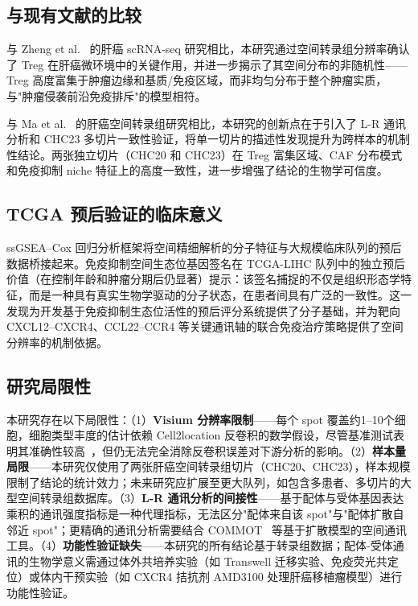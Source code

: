 \documentclass[12pt, a4paper]{ctexart}
\begin{document}
\subsection{与现有文献的比较}

与 Zheng et al.~\cite{zheng2017landscape} 的肝癌 scRNA-seq 研究相比，本研究通过空间转录组分辨率确认了 Treg 在肝癌微环境中的关键作用，并进一步揭示了其空间分布的非随机性——Treg 高度富集于肿瘤边缘和基质/免疫区域，而非均匀分布于整个肿瘤实质，与"肿瘤侵袭前沿免疫排斥"的模型相符。

与 Ma et al.~\cite{ma2019comprehensive} 的肝癌空间转录组研究相比，本研究的创新点在于引入了 L-R 通讯分析和 CHC23 多切片一致性验证，将单一切片的描述性发现提升为跨样本的机制性结论。两张独立切片（CHC20 和 CHC23）在 Treg 富集区域、CAF 分布模式和免疫抑制 niche 特征上的高度一致性，进一步增强了结论的生物学可信度。

\subsection{TCGA 预后验证的临床意义}

ssGSEA--Cox 回归分析框架将空间精细解析的分子特征与大规模临床队列的预后数据桥接起来。免疫抑制空间生态位基因签名在 TCGA-LIHC 队列中的独立预后价值（在控制年龄和肿瘤分期后仍显著）提示：该签名捕捉的不仅是组织形态学特征，而是一种具有真实生物学驱动的分子状态，在患者间具有广泛的一致性。这一发现为开发基于免疫抑制生态位活性的预后评分系统提供了分子基础，并为靶向 CXCL12--CXCR4、CCL22--CCR4 等关键通讯轴的联合免疫治疗策略提供了空间分辨率的机制依据。

\subsection{研究局限性}

本研究存在以下局限性：（1）\textbf{Visium 分辨率限制}——每个 spot 覆盖约1--10个细胞，细胞类型丰度的估计依赖 Cell2location 反卷积的数学假设，尽管基准测试表明其准确性较高~\cite{sang2023spotless}，但仍无法完全消除反卷积误差对下游分析的影响。（2）\textbf{样本量局限}——本研究仅使用了两张肝癌空间转录组切片（CHC20、CHC23），样本规模限制了结论的统计效力；未来研究应扩展至更大队列，如包含多患者、多切片的大型空间转录组数据库。（3）\textbf{L-R 通讯分析的间接性}——基于配体与受体基因表达乘积的通讯强度指标是一种代理指标，无法区分"配体来自该 spot"与"配体扩散自邻近 spot"；更精确的通讯分析需要结合 COMMOT~\cite{cang2023commot} 等基于扩散模型的空间通讯工具。（4）\textbf{功能性验证缺失}——本研究的所有结论基于转录组数据；配体-受体通讯的生物学意义需通过体外共培养实验（如 Transwell 迁移实验、免疫荧光共定位）或体内干预实验（如 CXCR4 拮抗剂 AMD3100 处理肝癌移植瘤模型）进行功能性验证。
\end{document}
